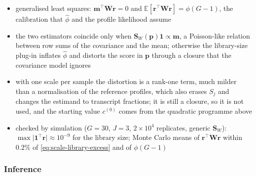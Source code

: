 \begin{remark}
\begin{itemize}
\begin{equation}
          \end{equation}
          by the Cauchy--Schwarz inequality in the \(\boldsymbol{W}\) inner product
    \item generalised least squares: \(\boldsymbol{m}^{\top}\boldsymbol{W}\boldsymbol{r}=0\) and
          \(\mathbb{E}[\boldsymbol{r}^{\top}\boldsymbol{W}\boldsymbol{r}]=\phi(G-1)\), the calibration that \(\hat\phi\) and the
          profile likelihood assume
    \item the two estimators coincide only when \(\boldsymbol{S}_{W}(\boldsymbol{p})\mathbf{1}\propto\boldsymbol{m}\), a Poisson-like
          relation between row sums of the covariance and the mean; otherwise the library-size plug-in inflates
          \(\hat\phi\) and distorts the score in \(\boldsymbol{p}\) through a closure that the covariance model ignores
    \item with one scale per sample the distortion is a rank-one term, much milder than a normalisation of the
          reference profiles, which also erases \(S_{j}\) and changes the estimand to transcript fractions; it
          is still a closure, so it is not used, and the starting value \(c^{(0)}\) comes from the quadratic programme above
    \item checked by simulation (\(G=30\), \(J=3\), \(2\times10^{4}\) replicates, generic \(\boldsymbol{S}_{W}\)):
          \(\max\lvert\mathbf{1}^{\top}\boldsymbol{r}\rvert\approx10^{-9}\) for the library size; Monte Carlo means of
          \(\boldsymbol{r}^{\top}\boldsymbol{W}\boldsymbol{r}\) within \(0.2\%\) of \eqref{eq:scale-library-excess} and of \(\phi(G-1)\)
  \end{itemize}
\end{remark}

\subsubsection{Inference}
\label{app:sc-inference}

